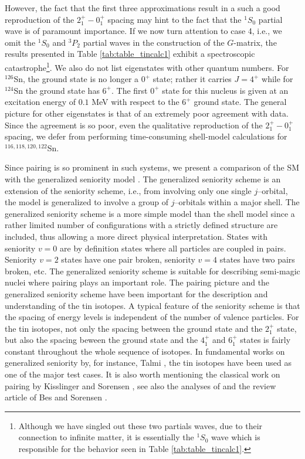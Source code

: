 \documentclass[rmp,aps,floatfix]{revtex4}
\begin{document}
However, the fact that the first three  approximations result in a such a good
reproduction of the  $2^+_1-0^+_1$ spacing may hint to the fact that the 
$^1S_0$ partial wave is of paramount importance. 
If we now turn attention to case 4, i.e., we omit the
$^1S_0$ and $^3P_2$ partial waves in the construction of the $G$-matrix,
the results presented  in 
Table \ref{tab:table_tincalc1} exhibit  a spectroscopic 
catastrophe\footnote{Although we have singled out these
two partials waves, due to their connection to infinite matter, it is 
essentially the $^1S_0$ wave which is responsible for the behavior seen
in Table \ref{tab:table_tincalc1}.}. We also do not list eigenstates
with other quantum numbers. For $^{126}$Sn,
the ground state is no longer a $0^+$ state; rather it carries 
$J=4^+$ while for $^{124}$Sn the ground state 
has $6^+$. The first $0^+$ state for this nucleus is given at an excitation
energy of $0.1$ MeV with respect to the $6^+$ ground state.
The general picture for other eigenstates is that of 
an extremely poor agreement
with data.  
Since the agreement is so poor, even the qualitative reproduction of the 
$2^+_1-0^+_1$ spacing, we defer from performing time-consuming shell-model
calculations for $^{116,118,120,122}$Sn.

Since pairing is so prominent in such systems, 
we present a comparison of the SM with the generalized
seniority model \cite{talmi93}. The generalized seniority scheme is an 
extension of the seniority scheme, i.e., from involving only one single 
$j$--orbital, the model is generalized to involve a group of $j$--orbitals 
within a major shell. The generalized seniority scheme is a more simple 
model than the shell model since a rather limited number of configurations 
with a strictly defined structure are included, thus allowing a more
direct physical interpretation. States with seniority $v=0$ are by 
definition states where all particles are coupled in pairs. Seniority 
$v=2$ states have one pair broken, seniority $v=4$ states have two pairs 
broken, etc. The generalized seniority scheme is suitable for describing 
semi-magic nuclei where pairing plays an important role. The pairing picture 
and the generalized seniority scheme have been important for the description 
and understanding of the tin isotopes. A typical feature of the seniority 
scheme is that the spacing of energy levels is independent of the number of 
valence particles. For the tin isotopes, not only the spacing between the 
ground state and the $2^{+}_{1}$ state, but also the spacing beween the 
ground state and the $4^{+}_{1}$ and $6^{+}_{1}$ states is fairly constant 
throughout the whole sequence of isotopes. In fundamental works on generalized 
seniority by, for instance, Talmi \cite{talmi93}, the tin isotopes have been 
used as one of the major test cases. It is also worth mentioning the 
classical work on pairing by Kisslinger and Sorensen \cite{kiss60}, see also
the analyses of \cite{sandulescu97} and the review article of Bes
and Sorensen \cite{besreview}. 
\end{document}
